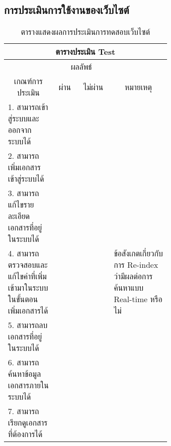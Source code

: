 \subsection{การประเมินการใช้งานของเว็บไซต์}
\begin{table}[H]
    \caption{ตารางแสดงผลการประเมินการทดสอบเว็บไซต์}\label{tbl:test2}
    \begin{tabular}{|p{0.3\linewidth}|l|l|p{0.35\linewidth}|}
    \hline
    \multicolumn{4}{|c|}{ตารางประเมิน Test}                                                               \\ \hline
    \multicolumn{1}{|c|}{}                         & \multicolumn{2}{c|}{ผลลัพธ์} & \multicolumn{1}{c|}{} \\ \cline{2-3}
    \multicolumn{1}{|c|}{\multirow{-2}{*}{เกณฑ์การประเมิน}} &
        \multicolumn{1}{c|}{ผ่าน} &
        \multicolumn{1}{c|}{ไม่ผ่าน} &
        \multicolumn{1}{c|}{\multirow{-2}{*}{หมายเหตุ}} \\ \hline
    1. สามารถเข้าสู่ระบบและออกจาก ระบบได้          & \cellcolor[HTML]{B5E645}  &  &                       \\ \hline
    2. สามารถเพิ่มเอกสารเข้าสู่ระบบได้             & \cellcolor[HTML]{B5E645}  &  &                       \\ \hline
    3. สามารถแก้ไขรายละเอียดเอกสารที่อยู่ในระบบได้ & \cellcolor[HTML]{B5E645}  &  &                       \\ \hline
    4. สามารถตรวจสอบและแก้ไขคำที่เพิ่มเข้ามาในระบบในขั้นตอนเพิ่มเอกสารได้ & 
        \cellcolor[HTML]{B5E645} & 
        & ข้อสังเกตเกี่ยวกับการ Re-index ว่ามีผลต่อการค้นหาแบบ Real-time หรือไม่
        \\ \hline
    5. สามารถลบเอกสารที่อยู่ในระบบได้              & \cellcolor[HTML]{B5E645}  &  &                       \\ \hline
    6.   สามารถค้นหาข้อมูลเอกสารภายในระบบได้       & \cellcolor[HTML]{B5E645}  &  &                       \\ \hline
    7.   สามารถเรียกดูเอกสารที่ต้องการได้          & \cellcolor[HTML]{B5E645}  &  &                       \\ \hline
    \end{tabular}
    \end{table}
